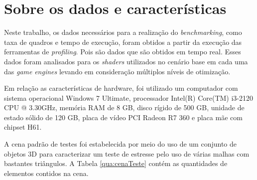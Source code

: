 \section{Sobre os dados e características}
\label{sec:sobre-os-dados}

Neste trabalho, os dados necessários para a realização do \textit{benchmarking}, como taxa de quadros e tempo de execução, foram obtidos a partir da execução das ferramentas de \textit{profiling}. Pois são dados que são obtidos em tempo real. Esses dados foram analisados para os \textit{shaders} utilizados no cenário base em cada uma das \textit{game} \textit{engines} levando em consideração múltiplos níveis de otimização.

Em relação as características de hardware, foi utilizado um computador com sistema operacional Windows 7 Ultimate, processador Intel(R) Core(TM) i3-2120 CPU @ 3.30GHz, memória RAM de 8 GB, disco rígido de 500 GB, unidade de estado sólido de 120 GB, placa de vídeo PCI Radeon R7 360 e placa mãe com chipset H61.

A cena padrão de testes foi estabelecida por meio do uso de um conjunto de objetos 3D para caracterizar um teste de estresse pelo uso de várias malhas com bastantes triângulos. A Tabela \ref{qua:cenaTeste} contém as quantidades de elementos contidos na cena.


 
